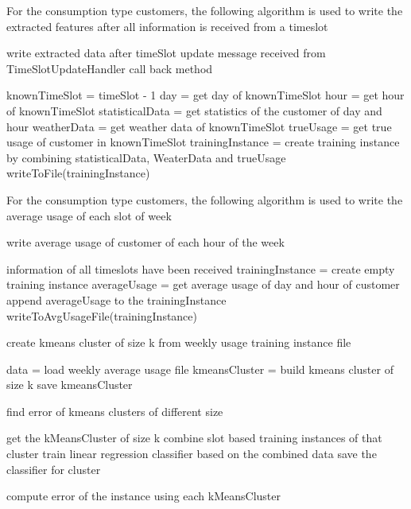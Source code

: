 For the consumption type customers, the following algorithm is used to write the extracted features after all information is received from a timeslot
\begin{algorithm}
\caption{write extracted data after timeSlot update message received from TimeSlotUpdateHandler call back method}
\begin{algorithmic} 
\STATE knownTimeSlot = timeSlot - 1
\STATE day = get day of knownTimeSlot
\STATE hour = get hour of knownTimeSlot
\STATE statisticalData = get statistics of the customer of day and hour
\STATE weatherData = get weather data of knownTimeSlot
\STATE trueUsage = get true usage of customer in knownTimeSlot
\STATE trainingInstance = create training instance by combining statisticalData, WeaterData and trueUsage 
\STATE writeToFile(trainingInstance)
\ENDFOR
\end{algorithmic}
\end{algorithm}

For the consumption type customers, the following algorithm is used to write the average usage of each slot of week
\begin{algorithm}
\caption{write average usage of customer of each hour of the week}
\begin{algorithmic} 
\REQUIRE information of all timeslots have been received
	\STATE trainingInstance = create empty training instance
			\STATE averageUsage = get average usage of day and hour of customer
			\STATE append averageUsage to the trainingInstance
		\ENDFOR
	\ENDFOR
	\STATE writeToAvgUsageFile(trainingInstance)
\ENDFOR
\end{algorithmic}
\end{algorithm}


\begin{algorithm}
\caption{create kmeans cluster of size k from weekly usage training instance file}
\begin{algorithmic} 
\STATE data = load weekly average usage file
\STATE kmeansCluster = build kmeans cluster of size k
\STATE save kmeansCluster
\end{algorithmic}
\end{algorithm}



\begin{algorithm}
\caption{find error of kmeans clusters of different size}
\begin{algorithmic} 

	\STATE get the kMeansCluster of size k
		\STATE combine slot based training instances of that cluster
		\STATE train linear regression classifier based on the combined data
		\STATE save the classifier for cluster
	\ENDFOR
\ENDFOR

	\STATE compute error of the instance using each kMeansCluster
\ENDFOR
\end{algorithmic}
\end{algorithm}

